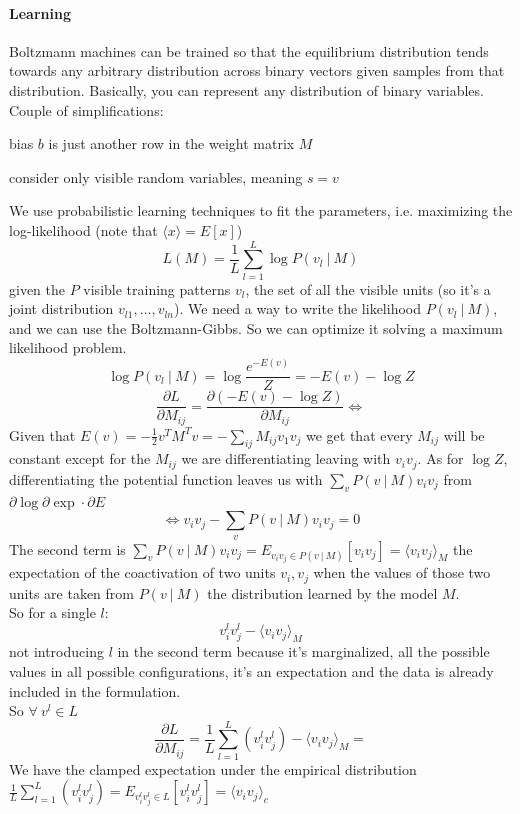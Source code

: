 \documentclass[10pt]{report}
\begin{document}
\paragraph{Learning} Boltzmann machines can be trained so that the equilibrium distribution tends towards any arbitrary distribution across binary vectors given samples from that distribution. Basically, you can represent any distribution of binary variables.\\
Couple of simplifications:
\begin{list}{}{}
	\item bias $b$ is just another row in the weight matrix $M$
	\item consider only visible random variables, meaning $s = v$
\end{list}
We use probabilistic learning techniques to fit the parameters, i.e. maximizing the log-likelihood (note that $\langle x\rangle = E[x]$) $$L(M)=\frac{1}{L}\sum_{l=1}^L \log P(v_l\:|\:M)$$
given the $P$ visible training patterns $v_l$, the set of all the visible units (so it's a joint distribution $v_{l1},\ldots,v_{ln}$). We need a way to write the likelihood $P(v_l\:|\:M)$, and we can use the Boltzmann-Gibbs. So we can optimize it solving a maximum likelihood problem.
$$\log P(v_l\:|\:M) = \log \frac{e^{-E(v)}}{Z} = -E(v) - \log Z$$
$$\frac{\partial L}{\partial M_{ij}} = \frac{\partial (-E(v) - \log Z)}{\partial M_{ij}}\Leftrightarrow$$
Given that $E(v) = -\frac{1}{2}v^TM^Tv = -\sum_{ij} M_{ij} v_1v_j$ we get that every $M_{ij}$ will be constant except for the $M_{ij}$ we are differentiating leaving with $v_iv_j$. As for $\log Z$, differentiating the potential function leaves us with $\sum_v P(v\:|\:M)v_iv_j$ from $\partial\log\partial\exp\cdot\partial E$
$$\Leftrightarrow v_iv_j - \sum_v P(v\:|\:M)v_iv_j = 0$$
The second term is $\sum_v P(v\:|\:M)v_iv_j = E_{v_iv_j\in P(v\:|\:M)}[v_iv_j] = \langle v_iv_j\rangle_M$ the expectation of the coactivation of two units $v_i,v_j$ when the values of those two units are taken from $P(v\:|\:M)$ the distribution learned by the model $M$.\\
So for a single $l$:
$$v_i^lv_j^l - \langle v_iv_j\rangle_M$$
not introducing $l$ in the second term because it's marginalized, all the possible values in all possible configurations, it's an expectation and the data is already included in the formulation.\\
So $\forall\:v^l\in L$ $$\frac{\partial L}{\partial M_{ij}} = \frac{1}{L}\sum_{l=1}^L (v_i^lv_j^l)-\langle v_iv_j\rangle_M=$$
We have the clamped expectation under the empirical distribution $\frac{1}{L}\sum_{l=1}^L (v_i^lv_j^l) = E_{v_i^lv_j^l\in L}[v_i^lv_j^l] = \langle v_iv_j\rangle_c$
\end{document}
